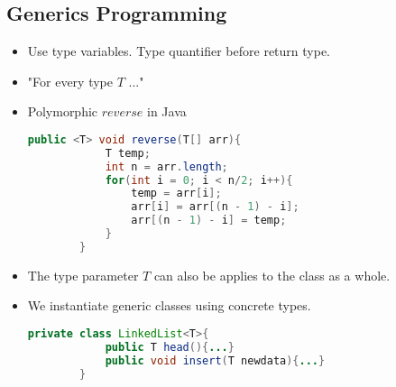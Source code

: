 \documentclass[a4paper]{article}
\begin{document}
\subsection{Generics Programming}
\begin{itemize}
    \item Use type variables. Type quantifier before return type.
    \item "For every type $T$ ..."
    \item Polymorphic $reverse$ in Java
    \begin{lstlisting}[language=Java]
        public <T> void reverse(T[] arr){
            T temp;
            int n = arr.length;
            for(int i = 0; i < n/2; i++){
                temp = arr[i];
                arr[i] = arr[(n - 1) - i];
                arr[(n - 1) - i] = temp;
            }
        }
    \end{lstlisting}
    \item The type parameter $T$ can also be applies to the class as a whole.
    \item We instantiate generic classes using concrete types.
    \begin{lstlisting}[language=Java]
        private class LinkedList<T>{
            public T head(){...}
            public void insert(T newdata){...}
        }


\end{lstlisting}
\end{itemize}
\end{document}
